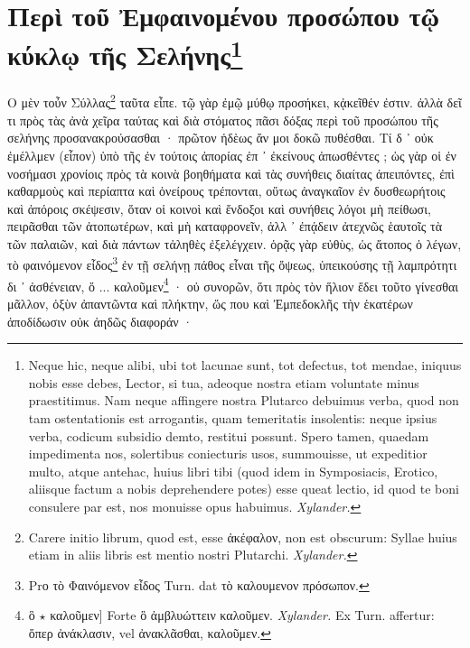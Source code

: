 \documentclass[a4paper, 11pt, oneside, polutonikogreek, german]{article}
\begin{document}
\section[Περὶ τοῦ Ἐμφαινομένου προσώπου τῷ κύκλῳ τῆς Σελήνης]{Περὶ τοῦ Ἐμφαινομένου προσώπου τῷ κύκλῳ τῆς Σελήνης\footnote{Neque hic, neque alibi, ubi tot lacunae sunt, tot defectus, tot mendae, iniquus nobis esse debes, Lector, si tua, adeoque nostra etiam voluntate minus praestitimus. Nam neque affingere nostra Plutarco debuimus verba, quod non tam ostentationis est arrogantis, quam temeritatis insolentis: neque ipsius verba, codicum subsidio demto, restitui possunt. Spero tamen, quaedam impedimenta nos, solertibus coniecturis usos, summouisse, ut expeditior multo, atque antehac, huius libri tibi (quod idem in Symposiacis, Erotico, aliisque factum a nobis deprehendere potes) esse queat lectio, id quod te boni consulere par est, nos monuisse opus habuimus. \emph{Xylander.}}}
\paragraph{}
Ο μὲν τοὖν Σύλλας\footnote{Carere initio librum, quod est, esse ἀκέφαλον, non est obscurum: Syllae huius etiam in aliis libris est mentio nostri Plutarchi. \emph{Xylander.}} ταῦτα εἶπε. τῷ γὰρ ἐμῷ μύθῳ προσήκει, κᾀκεῖθέν ἐστιν. ἀλλὰ δεῖ τι πρὸς τὰς ἀνὰ χεῖρα ταύτας καὶ διὰ στόματος πᾶσι δόξας περὶ τοῦ προσώπου τῆς σελήνης προσανακρούσασθαι · πρῶτον ἡδὲως ἄν μοι δοκῶ πυθέσθαι. Τί δ ᾽ οὐκ ἐμέλλμεν (εἶπον) ὑπὸ τῆς ἐν τούτοις ἀπορίας ἐπ ᾽ ἐκείνους ἀπωσθέντες ; ὡς γὰρ οἱ ἐν νοσήμασι χρονίοις πρὸς τὰ κοινὰ βοηθήματα καὶ τὰς συνήθεις διαίτας ἀπειπόντες, ἐπὶ καθαρμοὺς καὶ περίαπτα καὶ ὀνείρους τρέπονται, οὕτως ἀναγκαῖον ἐν δυσθεωρήτοις καὶ ἀπόροις σκέψεσιν, ὅταν οἱ κοινοὶ καὶ ἔνδοξοι καὶ συνήθεις λόγοι μὴ πείθωσι, πειρᾶσθαι τῶν ἀτοπωτέρων, καὶ μὴ καταφρονεῖν, ἀλλ ᾽ ἐπᾴδειν ἀτεχνῶς ἑαυτοῖς τὰ τῶν παλαιῶν, καὶ διὰ πάντων τἀληθὲς ἐξελέγχειν. ὁρᾷς γὰρ εὐθὺς, ὡς ἄτοπος ὁ λέγων, τὸ φαινόμενον εἶδος\footnote{Ρrο τὸ Φαινόμενον εἶδος Turn. dat τὸ καλουμενον πρόσωπον.} ἐν τῇ σελήνῃ πάθος εἶναι τῆς ὄψεως, ὑπεικούσης τῇ λαμπρότητι δι ᾽ ἀσθένειαν, ὅ ... καλοῦμεν\footnote{ὃ $\star$ καλοῦμεν] Forte ὃ ἀμβλυώττειν καλοῦμεν. \emph{Xylander.} Ex Turn. affertur: ὅπερ ἀνάκλασιν, vel ἀνακλᾶσθαι, καλοῦμεν.} · οὐ συνορῶν, ὅτι πρὸς τὸν ἥλιον ἔδει τοῦτο γίνεσθαι μᾶλλον, ὀξὺν ἀπαντῶντα καὶ πλήκτην, ὥς που καὶ Ἐμπεδοκλῆς τὴν ἑκατέρων ἀποδίδωσιν οὐκ ἀηδῶς διαφοράν ·
\end{document}
